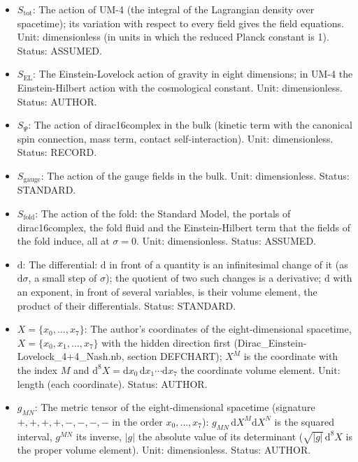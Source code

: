 \documentclass[
  10pt,
]{article}
\providecommand{\tightlist}{%
  \setlength{\itemsep}{0pt}\setlength{\parskip}{0pt}}
\begin{document}
\begin{itemize}
\tightlist
\item
  \(S_{\mathrm{tot}}\): The action of UM-4 (the integral of the
  Lagrangian density over spacetime); its variation with respect to
  every field gives the field equations. Unit: dimensionless (in units
  in which the reduced Planck constant is 1). Status: ASSUMED.
\item
  \(S_{\mathrm{EL}}\): The Einstein-Lovelock action of gravity in eight
  dimensions; in UM-4 the Einstein-Hilbert action with the cosmological
  constant. Unit: dimensionless. Status: AUTHOR.
\item
  \(S_\Psi\): The action of dirac16complex in the bulk (kinetic term
  with the canonical spin connection, mass term, contact
  self-interaction). Unit: dimensionless. Status: RECORD.
\item
  \(S_{\mathrm{gauge}}\): The action of the gauge fields in the bulk.
  Unit: dimensionless. Status: STANDARD.
\item
  \(S_{\mathrm{fold}}\): The action of the fold: the Standard Model, the
  portals of dirac16complex, the fold fluid and the Einstein-Hilbert
  term that the fields of the fold induce, all at \(\sigma = 0\). Unit:
  dimensionless. Status: ASSUMED.
\item
  \(\mathrm{d}\): The differential: \(\mathrm{d}\) in front of a
  quantity is an infinitesimal change of it (as \(\mathrm{d}\sigma\), a
  small step of \(\sigma\)); the quotient of two such changes is a
  derivative; \(\mathrm{d}\) with an exponent, in front of several
  variables, is their volume element, the product of their
  differentials. Status: STANDARD.
\item
  \(X = \{x_0, \dots, x_7\}\): The author's coordinates of the
  eight-dimensional spacetime, \(X = \{x_0, x_1, \dots, x_7\}\) with the
  hidden direction first (Dirac\_Einstein-Lovelock\_4+4\_Nash.nb,
  section DEFCHART); \(X^M\) is the coordinate with the index \(M\) and
  \(\mathrm{d}^8X = \mathrm{d}x_0\,\mathrm{d}x_1\cdots\mathrm{d}x_7\)
  the coordinate volume element. Unit: length (each coordinate). Status:
  AUTHOR.
\item
  \(g_{MN}\): The metric tensor of the eight-dimensional spacetime
  (signature \(+,+,+,+,-,-,-,-\) in the order \(x_0, \dots, x_7\)):
  \(g_{MN}\,\mathrm{d}X^M\mathrm{d}X^N\) is the squared interval,
  \(g^{MN}\) its inverse, \(\lvert g\rvert\) the absolute value of its
  determinant (\(\sqrt{\lvert g\rvert}\,\mathrm{d}^8X\) is the proper
  volume element). Unit: dimensionless. Status: AUTHOR.

\end{itemize}
\end{document}

